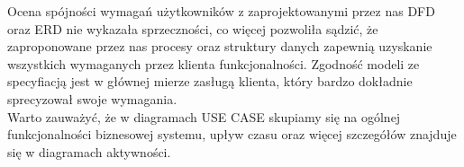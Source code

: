 Ocena spójności wymagań użytkowników z zaprojektowanymi przez nas DFD oraz ERD nie wykazała sprzeczności, co więcej pozwoliła sądzić, że zaproponowane przez nas procesy oraz struktury danych zapewnią uzyskanie wszystkich wymaganych przez klienta funkcjonalności. Zgodność modeli ze specyfiacją jest w głównej mierze zasługą klienta, który bardzo dokładnie sprecyzował swoje wymagania. \\
Warto zauważyć, że w diagramach USE CASE skupiamy się na ogólnej funkcjonalności biznesowej systemu, upływ czasu oraz więcej szczegółów znajduje się w diagramach aktywności.

